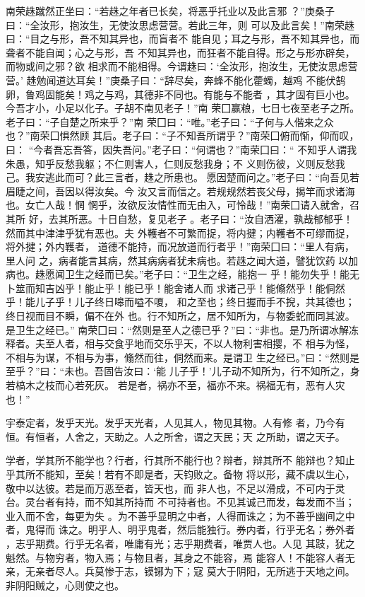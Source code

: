 \documentclass[12pt,UTF8]{ctexbook}
\begin{document}
南荣趎蹴然正坐曰：“若趎之年者已长矣，将恶乎托业以及此言邪 ？”庚桑子曰：“全汝形，抱汝生，无使汝思虑营营。若此三年，则 可以及此言矣！”南荣趎曰：“目之与形，吾不知其异也，而盲者不 能自见；耳之与形，吾不知其异也，而聋者不能自闻；心之与形，吾 不知其异也，而狂者不能自得。形之与形亦辟矣，而物或间之邪？欲 相求而不能相得。今谓趎曰：‘全汝形，抱汝生，无使汝思虑营营。’ 趎勉闻道达耳矣！”庚桑子曰：“辞尽矣，奔蜂不能化藿蠋，越鸡 不能伏鹄卵，鲁鸡固能矣！鸡之与鸡，其德非不同也。有能与不能者 ，其才固有巨小也。今吾才小，小足以化子。子胡不南见老子！”南 荣囗赢粮，七日七夜至老子之所。老子曰：“子自楚之所来乎？”南 荣囗曰：“唯。”老子曰：“子何与人偕来之众也？”南荣囗惧然顾 其后。老子曰：“子不知吾所谓乎？”南荣囗俯而惭，仰而叹，曰： “今者吾忘吾答，因失吾问。”老子曰：“何谓也？”南荣囗曰：“ 不知乎人谓我朱愚，知乎反愁我躯；不仁则害人，仁则反愁我身；不 义则伤彼，义则反愁我己。我安逃此而可？此三言者，趎之所患也。 愿因楚而问之。”老子曰：“向吾见若眉睫之间，吾因以得汝矣。今 汝又言而信之。若规规然若丧父母，揭竿而求诸海也。女亡人哉！惘 惘乎，汝欲反汝情性而无由入，可怜哉！”南荣囗请入就舍，召其所 好，去其所恶。十日自愁，复见老子 。老子曰：“汝自洒濯，孰哉郁郁乎！然而其中津津乎犹有恶也。夫 外韄者不可繁而捉，将内揵；内韄者不可缪而捉，将外揵；外内韄者， 道德不能持，而况放道而行者乎！”南荣囗曰：“里人有病，里人问 之，病者能言其病，然其病病者犹未病也。若趎之闻大道，譬犹饮药 以加病也。趎愿闻卫生之经而已矣。”老子曰：“卫生之经，能抱一 乎！能勿失乎！能无卜筮而知吉凶乎！能止乎！能已乎！能舍诸人而 求诸己乎！能翛然乎！能侗然乎！能儿子乎！儿子终日嗥而嗌不嗄， 和之至也；终日握而手不掜，共其德也；终日视而目不瞬，偏不在外 也。行不知所之，居不知所为，与物委蛇而同其波。是卫生之经已。” 南荣囗曰：“然则是至人之德已乎？”曰：“非也。是乃所谓冰解冻 释者。夫至人者，相与交食乎地而交乐乎天，不以人物利害相撄，不 相与为怪，不相与为谋，不相与为事，翛然而往，侗然而来。是谓卫 生之经已。”曰：“然则是至乎？”曰：“未也。吾固告汝曰：‘能 儿子乎！’儿子动不知所为，行不知所之，身若槁木之枝而心若死灰。 若是者，祸亦不至，福亦不来。祸福无有，恶有人灾也！”

宇泰定者，发乎天光。发乎天光者，人见其人，物见其物。人有修 者，乃今有恒。有恒者，人舍之，天助之。人之所舍，谓之天民；天 之所助，谓之天子。

学者，学其所不能学也？行者，行其所不能行也？辩者，辩其所不 能辩也？知止乎其所不能知，至矣！若有不即是者，天钧败之。备物 将以形，藏不虞以生心，敬中以达彼。若是而万恶至者，皆天也，而 非人也，不足以滑成，不可内于灵台。灵台者有持，而不知其所持而 不可持者也。不见其诚己而发，每发而不当；业入而不舍，每更为失 。为不善乎显明之中者，人得而诛之；为不善乎幽间之中者，鬼得而 诛之。明乎人、明乎鬼者，然后能独行。券内者，行乎无名；券外者 ，志乎期费。行乎无名者，唯庸有光；志乎期费者，唯贾人也。人见 其跂，犹之魁然。与物穷者，物入焉；与物且者，其身之不能容，焉 能容人！不能容人者无亲，无亲者尽人。兵莫惨于志，镆铘为下；寇 莫大于阴阳，无所逃于天地之间。非阴阳贼之，心则使之也。
\end{document}
